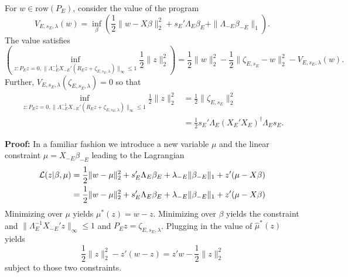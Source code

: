 \documentclass{article}
\begin{document}
          
        \begin{lemma}
          For $w \in \text{row}(P_E)$, consider the value of the
          program
          \begin{equation}
            \label{eq:dual:value}
            V_{E,s_E,\lambda}(w) = \inf_{\beta} \left(\frac{1}{2}
            \|w-X\beta\|^2_2 + s_E'\Lambda_E\beta_E +
            \|\Lambda_{-E}\beta_{-E}\|_1 \right).
          \end{equation}
The value satisfies
          \begin{equation}
            \label{eq:value:map}
\left( \inf_{z:P_Ez=0,
  \|\Lambda_{-E}^{-1}X_{-E}'(R_Ez+\zeta_{E,s_E,\lambda})\|_{\infty} \leq 1}
\frac{1}{2} \|z\|^2_2 \right) = \frac{1}{2} \|w\|^2_2 -
\frac{1}{2}\|\zeta_{E,s_E}-w\|^2_2 - V_{E,s_E,\lambda}(w).
          \end{equation}
          Further, $V_{E,s_E,\lambda}(\zeta_{E,s_E,\lambda}) = 0$ so that
          \begin{equation}
            \label{eq:LD:lasso}
            \begin{aligned}
            \inf_{z:P_Ez=0,
              \|\Lambda_{-E}^{-1}X_{-E}'(R_Ez+\zeta_{E,s_E,\lambda})\|_{\infty}
              \leq 1}\frac{1}{2} \|z\|^2_2  &= \frac{1}{2}
            \|\zeta_{E,s_E}\|^2_2 \\ &=
            \frac{1}{2}s_E'\Lambda_E(X_E'X_E)^{\dagger}\Lambda_Es_E.
          \end{aligned}
            \end{equation}
          \end{lemma}

        {\bf Proof:} In a familiar fashion we introduce a new variable
        $\mu$ and the linear constraint $\mu=X_{-E}\beta_{-E}$ leading
        to the Lagrangian
        $$
        \begin{aligned}
        {\cal L}(z|\beta,\mu) &= \frac{1}{2} \|w-\mu\|^2_2 +
        s_E'\Lambda_E\beta_E + \lambda_{-E} \|\beta_{-E}\|_1 +
        z'(\mu-X\beta) \\ &= \frac{1}{2} \|w-\mu\|^2_2 +
        s_E'\Lambda_E\beta_E + \lambda_{-E} \|\beta_{-E}\|_1 +
        z'(\mu-X\beta) \\
        \end{aligned}
        $$ Minimizing over $\mu$ yields $\mu^*(z)=w-z$. Minimizing
        over $\beta$ yields the constraint and
        $\|\Lambda_E^{-1}X_{-E}'z\|_{\infty} \leq 1$ and
        $P_Ez=\zeta_{E,s_E,\lambda}$.  Plugging in the value of
        $\hat{\mu}^*(z)$ yields
        $$ \frac{1}{2}\|z\|^2_2 - z'(w-z) = z'w - \frac{1}{2}\|z\|^2_2
        $$ subject to those two constraints.
\end{document}
